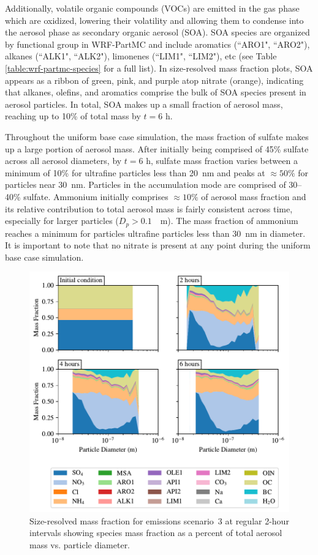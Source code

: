Additionally, volatile organic compounds (VOCs) are emitted in the gas phase which are oxidized, lowering their volatility and allowing them to condense into the aerosol phase as secondary organic aerosol (SOA). SOA species are organized by functional group in WRF-PartMC and include aromatics (``ARO1", ``ARO2"), alkanes (``ALK1", ``ALK2"), limonenes (``LIM1", ``LIM2"), etc (see Table \ref{table:wrf-partmc-species} for a full list). In size-resolved mass fraction plots, SOA appears as a ribbon of green, pink, and purple atop nitrate (orange), indicating that alkanes, olefins, and aromatics comprise the bulk of SOA species present in aerosol particles. In total, SOA makes up a small fraction of aerosol mass, reaching up to 10\% of total mass by $t=6$ h.

Throughout the uniform base case simulation, the mass fraction of sulfate makes up a large portion of aerosol mass. After initially being comprised of 45\% sulfate across all aerosol diameters, by $t=6$ h, sulfate mass fraction varies between a minimum of 10\% for ultrafine particles less than 20~nm and peaks at $\approx50\%$ for particles near 30~nm. Particles in the accumulation mode are comprised of 30--40\% sulfate. Ammonium initially comprises $\approx10\%$ of aerosol mass fraction and its relative contribution to total aerosol mass is fairly consistent across time, especially for larger particles ($D_p > 0.1$~\si{\mu m}). The mass fraction of ammonium reaches a minimum for particles ultrafine particles less than 30~nm in diameter. It is important to note that no nitrate is present at any point during the uniform base case simulation.

\begin{figure}[!t]
  \centering
    \includegraphics[width=\textwidth]{figures/chapter5/speciated-mass-frac-four-panel-point-source-1x1-z40.pdf}
    \caption{Size-resolved mass fraction for emissions scenario~3 at regular 2-hour intervals showing species mass fraction as a percent of total aerosol mass vs. particle diameter.}
    \label{fig:mass-frac-s3}
\end{figure}


